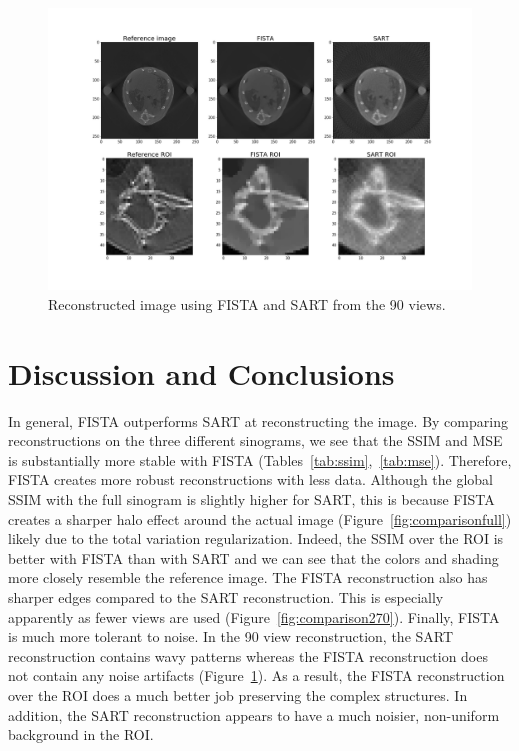 \documentclass[12pt]{article}
\newcommand{\noin}{\noindent}
\begin{document}
\begin{figure}[H]
	\centering
	\includegraphics[height=0.35\paperheight]{../results/comparison90.png}
	\caption{Reconstructed image using FISTA and SART from the 90 views.}
	\label{fig:comparison90}
\end{figure}

\section{Discussion and Conclusions}
\noin In general, FISTA outperforms SART at reconstructing the image. By comparing reconstructions on the three different sinograms, we see that the SSIM and MSE is substantially more stable with FISTA (Tables~\ref{tab:ssim},~\ref{tab:mse}). Therefore, FISTA creates more robust reconstructions with less data. Although the global SSIM with the full sinogram is slightly higher for SART, this is because FISTA creates a sharper halo effect around the actual image (Figure~\ref{fig:comparisonfull}) likely due to the total variation regularization. Indeed, the SSIM over the ROI is better with FISTA than with SART and we can see that the colors and shading more closely resemble the reference image. The FISTA reconstruction also has sharper edges compared to the SART reconstruction. This is especially apparently as fewer views are used (Figure~\ref{fig:comparison270}). Finally, FISTA is much more tolerant to noise. In the 90 view reconstruction, the SART reconstruction contains wavy patterns whereas the FISTA reconstruction does not contain any noise artifacts (Figure~\ref{fig:comparison90}). As a result, the FISTA reconstruction over the ROI does a much better job preserving the complex structures. In addition, the SART reconstruction appears to have a much noisier, non-uniform background in the ROI.
\end{document}

